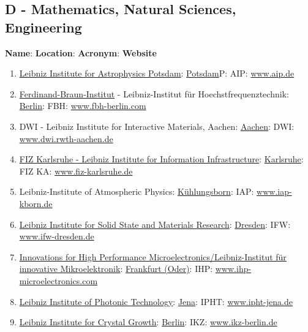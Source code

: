 \documentclass{book}
\numberwithin{equation}{section}
\begin{document}
\subsection{D - Mathematics, Natural Sciences, Engineering}
\textbf{Name}: \textbf{Location}: \textbf{Acronym}: \textbf{Website}
\begin{enumerate}
    \item \href{https://en.wikipedia.org/wiki/Leibniz_Institute_for_Astrophysics_Potsdam}{Leibniz Institute for Astrophysics Potsdam}: \href{https://en.wikipedia.org/wiki/Potsdam}{Potsdam}P: AIP: \url{www.aip.de}
    \item \href{https://en.wikipedia.org/wiki/Ferdinand-Braun-Institut}{Ferdinand-Braun-Institut} - Leibniz-Institut für Hoechstfrequenztechnik: \href{https://en.wikipedia.org/wiki/Berlin}{Berlin}: FBH: \url{www.fbh-berlin.com}
    \item DWI - Leibniz Institute for Interactive Materials, Aachen: \href{https://en.wikipedia.org/wiki/Aachen}{Aachen}: DWI: \url{www.dwi.rwth-aachen.de}
    \item \href{}{FIZ Karlsruhe - Leibniz Institute for Information Infrastructure}: \href{https://en.wikipedia.org/wiki/Karlsruhe}{Karlsruhe}: FIZ KA: \url{www.fiz-karlsruhe.de}
    \item Leibniz-Institute of Atmospheric Physics: \href{https://en.wikipedia.org/wiki/K%C3%BChlungsborn}{Kühlungsborn}: IAP: \url{www.iap-kborn.de}
    \item \href{https://en.wikipedia.org/wiki/Leibniz-Institut_f%C3%BCr_Festk%C3%B6rper-_und_Werkstoffforschung}{Leibniz Institute for Solid State and Materials Research}: \href{https://en.wikipedia.org/wiki/Dresden}{Dresden}: IFW: \url{www.ifw-dresden.de}
    \item \href{https://en.wikipedia.org/wiki/Innovations_for_High_Performance_Microelectronics_/_Leibniz-Institut_f%C3%BCr_innovative_Mikroelektronik}{Innovations for High Performance Microelectronics/Leibniz-Institut für innovative Mikroelektronik}: \href{https://en.wikipedia.org/wiki/Frankfurt_(Oder)}{Frankfurt (Oder)}: IHP: \url{www.ihp-microelectronics.com}
    \item \href{https://en.wikipedia.org/wiki/IPHT_Jena}{Leibniz Institute of Photonic Technology}: \href{https://en.wikipedia.org/wiki/Jena}{Jena}: IPHT: \url{www.ipht-jena.de}
    \item \href{https://en.wikipedia.org/wiki/Leibniz_Institute_for_Crystal_Growth}{Leibniz Institute for Crystal Growth}: \href{https://en.wikipedia.org/wiki/Berlin}{Berlin}: IKZ: \url{www.ikz-berlin.de}

\end{enumerate}
\end{document}
